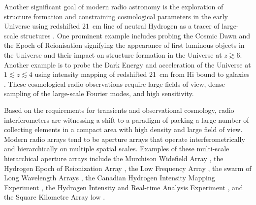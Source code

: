 \documentclass[
  journal=pasa,
  manuscript=article-type,
  year=2020,
  volume=37,
]{cup-journal}
\begin{document}
Another significant goal of modern radio astronomy is the exploration of structure formation and constraining cosmological parameters in the early Universe using redshifted 21~cm line of neutral Hydrogen as a tracer of large-scale structures \citep[][and references therein]{Morales+2010,Pritchard+2012}. One prominent example includes probing the Cosmic Dawn and the Epoch of Reionisation signifying the appearance of first luminous objects in the Universe and their impact on structure formation in the Universe at $z\gtrsim 6$. Another example is to probe the Dark Energy and acceleration of the Universe at $1\lesssim z\lesssim 4$ using intensity mapping of redshifted 21~cm from H{\sc i} bound to galaxies \citep{CosmicVisions+2018}. These cosmological radio observations require large fields of view, dense sampling of the large-scale Fourier modes, and high sensitivity. 

Based on the requirements for transients and observational cosmology, radio interferometers are witnessing a shift to a paradigm of packing a large number of collecting elements in a compact area with high density and large field of view. Modern radio arrays tend to be aperture arrays that operate interferometrically and hierarchically on multiple spatial scales. Examples of these multi-scale hierarchical aperture arrays include the Murchison Widefield Array \cite[MWA;][]{Tingay+2013}, the Hydrogen Epoch of Reionization Array \citep[HERA;][]{HERA+2017}, the Low Frequency Array \cite[LOFAR;][]{vanHaarlem+2013}, the swarm of Long Wavelength Arrays \cite[LWA Swarm;][]{Dowell+2018}, the Canadian Hydrogen Intensity Mapping Experiment \citep[CHIME;][]{CHIME+2022}, the Hydrogen Intensity and Real-time Analysis Experiment \citep[HIRAX;][]{HIRAX+2022}, and the Square Kilometre Array low \cite[SKA-low;][]{Dewdney+2009,SKA1+2019}. 
\end{document}

